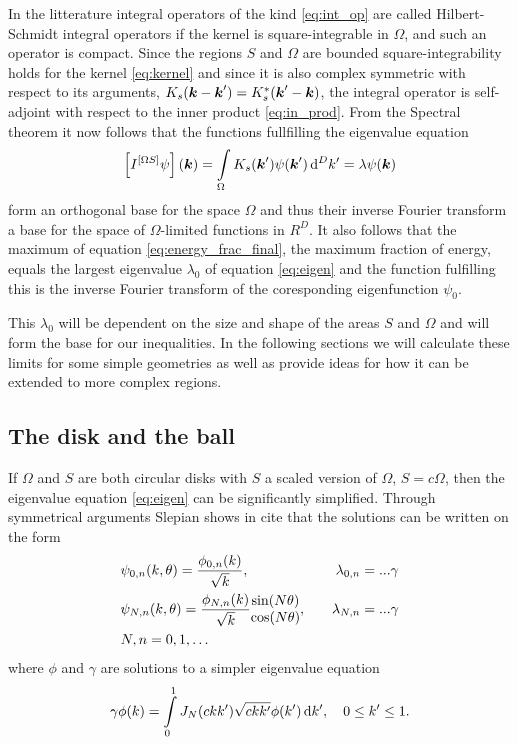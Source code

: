 \documentclass[11pt,a4paper, 
swedish,english %
]{article}
\begin{document}
 In the litterature integral operators of the kind \eqref{eq:int_op} are called Hilbert-Schmidt integral operators if the kernel is square-integrable in $\Omega$, and such an operator is compact. Since the regions $S$ and $\Omega$ are bounded square-integrability holds for the kernel \eqref{eq:kernel} and since it is also complex symmetric with respect to its arguments, $K_s(\vb*k-\vb*k')=K_s^*(\vb*k'-\vb*k)$, the integral operator is self-adjoint with respect to the inner product \eqref{eq:in_prod}. From the Spectral theorem it now follows that the functions fullfilling the eigenvalue equation
\begin{equation}
  \label{eq:eigen}
\qty[I^{[\Omega S]}\psi](\vb*k)=\int_\Omega K_s(\vb*k')\psi(\vb*k') \id^Dk'=\lambda \psi(\vb*k)
\end{equation}
form an orthogonal base for the space $\Omega$ and thus their inverse Fourier transform a base for the space of $\Omega$-limited functions in $R^D$. It also follows that the maximum of equation \eqref{eq:energy_frac_final}, the maximum fraction of energy, equals the largest eigenvalue $\lambda_0$ of equation \eqref{eq:eigen} and the function fulfilling this is the inverse Fourier transform of the coresponding eigenfunction $\psi_0$.

This $\lambda_0$ will be dependent on the size and shape of the areas $S$ and $\Omega$ and will form the base for our inequalities. In the following sections we will calculate these limits for some simple geometries as well as provide ideas for how it can be extended to more complex regions.

\subsection{The disk and the ball}
If $\Omega$ and $S$ are both circular disks with $S$ a scaled version of $\Omega$, $S=c\Omega$, then the eigenvalue equation \eqref{eq:eigen} can be significantly simplified. Through symmetrical arguments Slepian shows in cite that the solutions can be written on the form
\begin{align}
 &\psi_{0,n}(k,\theta)=\frac{\phi_{0,n}(k)}{\sqrt{k}}, \quad &\lambda_{0,n}= ...\gamma \\
  &\psi_{N,n}(k, \theta)=\frac{\phi_{N,n}(k)}{\sqrt{k}}\mqty{\sin(N\theta)\\ \cos(N\theta)} , \quad &\lambda_{N,n}= ... \gamma\\
  &N,n=0,1,\ldots
\end{align}
where $\phi$ and $\gamma$ are solutions to a simpler eigenvalue equation
\begin{equation}
  \label{eq:Bessel_int}
\gamma\phi(k)=\int_0^1 J_N(ckk')\sqrt{ckk'}\phi(k')\id k', \quad 0\leq k' \leq 1.
\end{equation}
\end{document}
